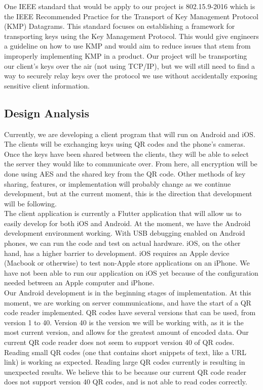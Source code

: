 \documentclass[11pt]{article}
\begin{document}
    One IEEE standard that would be apply to our project is 802.15.9-2016 which is the IEEE Recommended Practice for the Transport of Key Management Protocol (KMP) Datagrams. This standard focuses on establishing a framework for transporting keys using the Key Management Protocol. This would give engineers a guideline on how to use KMP and would aim to reduce issues that stem from improperly implementing KMP in a product. Our project will be transporting our client’s keys over the air (not using TCP/IP), but we will still need to find a way to securely relay keys over the protocol we use without accidentally exposing sensitive client information.


\subsection{Design Analysis}
Currently, we are developing a client program that will run on Android and iOS. The clients will be exchanging keys using QR codes and the phone’s cameras. Once the keys have been shared between the clients, they will be able to select the server they would like to communicate over. From here, all encryption will be done using AES and the shared key from the QR code. Other methods of key sharing, features, or implementation will probably change as we continue development, but at the current moment, this is the direction that development will be following.\\

The client application is currently a Flutter application that will allow us to easily develop for both iOS and Android. At the moment, we have the Android development environment working. With USB debugging enabled on Android phones, we can run the code and test on actual hardware. iOS, on the other hand, has a higher barrier to development. iOS requires an Apple device (Macbook or otherwise) to test non-Apple store applications on an iPhone. We have not been able to run our application on iOS yet because of the configuration needed between an Apple computer and iPhone.\\

Our Android development is in the beginning stages of implementation. At this moment, we are working on server communications, and have the start of a QR code reader implemented. QR codes have several versions that can be used, from version 1 to 40. Version 40 is the version we will be working with, as it is the most current version, and allows for the greatest amount of encoded data. Our current QR code reader does not seem to support version 40 of QR codes. Reading small QR codes (one that contains short snippets of text, like a URL link) is working as expected. Reading large QR codes currently is resulting in unexpected results. We believe this to be because our current QR code reader does not support version 40 QR codes, and is not able to read codes correctly.\\
\end{document}
